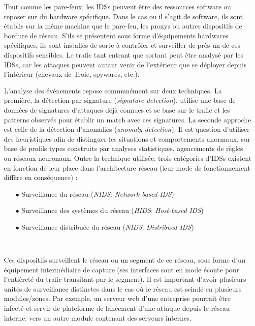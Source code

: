 \documentclass[]{article}
\newcommand{\minit}[1]{\noindent{\small\textbf{ \underline{#1}}}\vspace{0.2cm}}
\begin{document}
\par Tout comme les pare-feux, les IDSs peuvent être des ressources software ou reposer sur du hardware spécifique. Dans le cas ou il s'agit de software, ils sont établis sur la même machine que le pare-feu, les proxys ou autres dispositifs de bordure de réseau. S'ils se présentent sous forme d'équipements hardwares spécifiques, ils sont installés de sorte à contrôler et surveiller de près un de ces dispositifs sensibles. Le trafic tant entrant que sortant peut être analysé par les IDSs, car les attaques peuvent autant venir de l'extérieur que se déployer depuis l'intérieur (chevaux de Troie, spywares, etc.).\\

\par L'analyse des événements repose communément sur deux techniques. La première, la détection par signature (\textit{signature detection}), utilise une base de données de signatures d'attaques déjà connues et se base sur le trafic et les patterns observés pour établir un match avec ces signatures. La seconde approche est celle de la détection d'anomalies (\textit{anomaly detection}). Il est question d'utiliser des heuristiques afin de distinguer les situations et comportements anormaux, sur base de profils types construits par analyses statistiques, agencements de règles ou réseaux neuronaux. Outre la technique utilisée, trois catégories d'IDSs existent en fonction de leur place dans l'architecture réseau (leur mode de fonctionnement diffère en conséquence) :
\vspace{0.3cm}
\begin{itemize}
\item[$\bullet$] Surveillance du réseau (\textit{NIDS}:\textit{ Network-based IDS})
\item[$\bullet$] Surveillance des systèmes du réseau (\textit{HIDS}:\textit{ Host-based IDS}) 
\item[$\bullet$] Surveillance distribuée du réseau (\textit{NIDS}:\textit{ Distribued IDS}) 
\end{itemize} 
~\\
\minit{Les NIDSs}

\par Ces dispositifs surveillent le réseau ou un segment de ce réseau, sous forme d'un équipement intermédiaire de capture (ses interfaces sont en mode écoute pour l'entièreté du trafic transitant par le segment). Il est important d'avoir plusieurs unités de surveillance distinctes dans le cas où le réseau est scindé en plusieurs modules/zones. Par exemple, un serveur web d'une entreprise pourrait être infecté et servir de plateforme de lancement d'une attaque depuis le réseau interne, vers un autre module contenant des serveurs internes.\\
\end{document}
